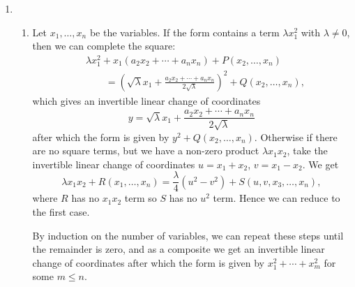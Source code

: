 \documentclass{report}
\begin{document}
\begin{enumerate}[label=\textbf{5.4.\Alph*.}]
	\item
	      \begin{enumerate}[label=(\alph*)]
		      \item Let $x_1,\ldots,x_n$ be the variables. If the form contains a
		            term $\lambda x_1^2$ with $\lambda\ne0$, then we can complete
		            the square:
		            \begin{align*}
			             & \lambda x_1^2 + x_1(a_2x_2+\cdots+a_nx_n)
			            + P(x_2,\ldots,x_n)                          \\
			             & \qquad= \left(\sqrt\lambda x_1
			            + \frac{a_2x_2+\cdots+a_nx_n}{2\sqrt\lambda}\right)^2
			            + Q(x_2,\ldots,x_n),
		            \end{align*}
		            which gives an invertible linear change of coordinates
		            \begin{equation*}
			            y = \sqrt\lambda x_1
			            + \frac{a_2x_2+\cdots+a_nx_n}{2\sqrt\lambda}
		            \end{equation*}
		            after which the form is given by $y^2 + Q(x_2,\ldots,x_n)$.
		            Otherwise if there are no square terms, but we have a non-zero
		            product $\lambda x_1x_2$, take the invertible linear change of
		            coordinates $u=x_1+x_2$, $v=x_1-x_2$. We get
		            \begin{equation*}
			            \lambda x_1x_2 + R(x_1,\ldots,x_n)
			            = \frac{\lambda}{4}(u^2-v^2) + S(u,v,x_3,\ldots,x_n),
		            \end{equation*}
		            where $R$ has no $x_1x_2$ term so $S$ has no $u^2$ term. Hence
		            we can reduce to the first case.

		            By induction on the number of variables, we can repeat these
		            steps until the remainder is zero, and as a composite we get an
		            invertible linear change of coordinates after which the form is
		            given by $x_1^2+\cdots+x_m^2$ for some $m\le n$.


\end{enumerate}
\end{enumerate}
\end{document}
